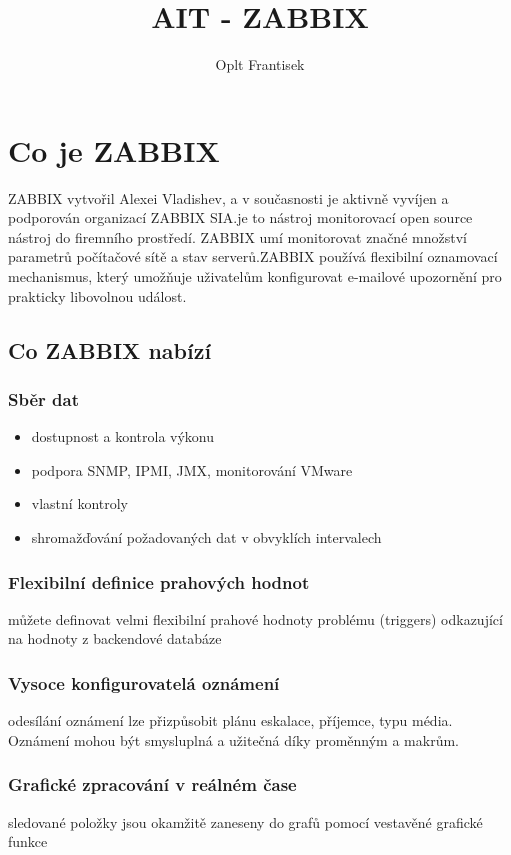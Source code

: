 \documentclass{article}
\title{AIT - ZABBIX}
\author{Oplt Frantisek }
\begin{document}
\maketitle
\newpage
\tableofcontents
\newpage
\section{Co je ZABBIX}
ZABBIX vytvořil Alexei Vladishev, a v současnosti je aktivně vyvíjen a podporován organizací ZABBIX SIA.je to nástroj monitorovací open source nástroj do firemního prostředí. ZABBIX umí monitorovat značné množství parametrů počítačové sítě a stav serverů.ZABBIX používá flexibilní oznamovací mechanismus, který umožňuje uživatelům konfigurovat e-mailové upozornění pro prakticky libovolnou událost.
\subsection{Co ZABBIX nabízí}
\subsubsection{Sběr dat}
    \begin{itemize}
        \item dostupnost a kontrola výkonu
        \item podpora SNMP, IPMI, JMX, monitorování VMware
        \item vlastní kontroly
        \item shromažďování požadovaných dat v obvyklích intervalech
    \end{itemize}
\subsubsection{Flexibilní definice prahových hodnot}
můžete definovat velmi flexibilní prahové hodnoty problému (triggers) odkazující na hodnoty z backendové databáze
\subsubsection{Vysoce konfigurovatelá oznámení}
odesílání oznámení lze přizpůsobit plánu eskalace, příjemce, typu média. Oznámení mohou být smysluplná a užitečná díky proměnným a makrům.
\subsubsection{Grafické zpracování v reálném čase}
sledované položky jsou okamžitě zaneseny do grafů pomocí vestavěné grafické funkce
\end{document}
